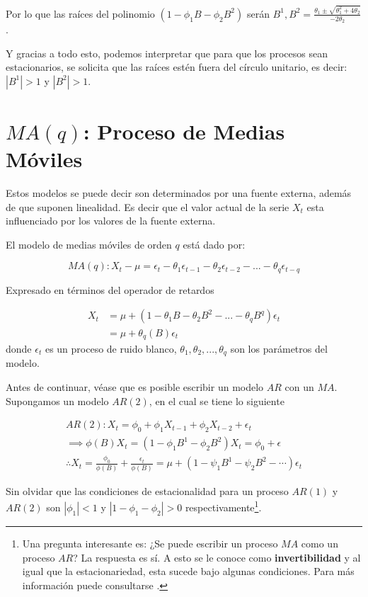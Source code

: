 \documentclass[
  a4paper,
  oneside,
  openany]{book}
\begin{document}
Por lo que las raíces del polinomio \((1-\phi_1B-\phi_2B^2)\) serán \(B^1, B^2 = \frac{\theta_1\pm\sqrt{\theta_1^2+4\theta_2}}{-2\theta_2}\).

Y gracias a todo esto, podemos interpretar que para que los procesos sean estacionarios, se solicita que las raíces estén fuera del círculo unitario, es decir: \(|B^1|>1\) y \(|B^2|>1\).

\hypertarget{maq-proceso-de-medias-muxf3viles}{%
\chapter{\texorpdfstring{\(MA(q)\): Proceso de Medias Móviles}{MA(q): Proceso de Medias Móviles}}\label{maq-proceso-de-medias-muxf3viles}}

Estos modelos se puede decir son determinados por una fuente externa, además de que suponen linealidad. Es decir que el valor actual de la serie \(X_t\) esta influenciado por los valores de la fuente externa.

El modelo de medias móviles de orden \(q\) está dado por:

\[
MA(q): X_t - \mu =\epsilon_t - \theta_1\epsilon_{t-1}-\theta_2\epsilon_{t-2}-...-\theta_q \epsilon_{t-q}
\]

Expresado en términos del operador de retardos

\[
\begin{split}
X_t&=\mu+(1-\theta_1B-\theta_2B^2-...-\theta_qB^q)\epsilon_t\\
&=\mu+\theta_q(B)\epsilon_t
\end{split}
\]
donde \(\epsilon_t\) es un proceso de ruido blanco, \(\theta_1,\theta_2, ..., \theta_q\) son los parámetros del modelo.

Antes de continuar, véase que es posible escribir un modelo \(AR\) con un \(MA\). Supongamos un modelo \(AR(2)\), en el cual se tiene lo siguiente

\[
\begin{array}{ll}
AR(2): X_t = \phi_0+\phi_1X_{t-1}+\phi_2X_{t-2}+\epsilon_t\\
\implies \phi(B)X_t = (1-\phi_1B^1-\phi_2B^2)X_t = \phi_0+\epsilon\\
\therefore X_t = \frac{\phi_0}{\phi(B)}+\frac{\epsilon_t}{\phi(B)} = \mu+(1-\psi_1B^1-\psi_2B^2-\cdots)\epsilon_t
\end{array}
\]

Sin olvidar que las condiciones de estacionalidad para un proceso \(AR(1)\) y \(AR(2)\) son \(|\phi_1|<1\) y \(|1-\phi_1-\phi_2|>0\) respectivamente\footnote{Una pregunta interesante es: ¿Se puede escribir un proceso \(MA\) como un proceso \(AR\)? La respuesta es sí. A esto se le conoce como \textbf{invertibilidad} y al igual que la estacionariedad, esta sucede bajo algunas condiciones. Para más información puede consultarse \citet{cryer2008time}.}.
\end{document}
